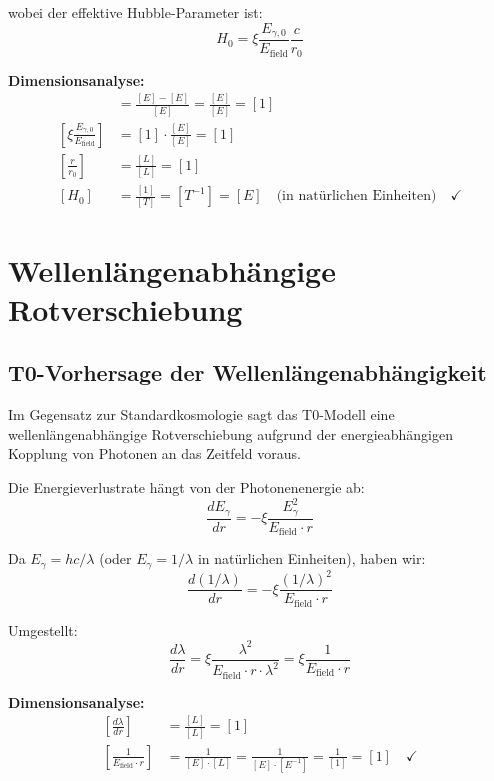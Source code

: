 \documentclass[12pt,a4paper]{report}
\begin{document}
	wobei der effektive Hubble-Parameter ist:
	\begin{equation}
		H_0 = \xi \frac{E_{\gamma,0}}{E_{\text{field}}} \frac{c}{r_0}
	\end{equation}
	
	\textbf{Dimensionsanalyse:}
	\begin{align}
		[z] &= \frac{[E] - [E]}{[E]} = \frac{[E]}{[E]} = [1] \\
		\left[\xi \frac{E_{\gamma,0}}{E_{\text{field}}}\right] &= [1] \cdot \frac{[E]}{[E]} = [1] \\
		\left[\frac{r}{r_0}\right] &= \frac{[L]}{[L]} = [1] \\
		[H_0] &= \frac{[1]}{[T]} = [T^{-1}] = [E] \quad \text{(in natürlichen Einheiten)} \quad \checkmark
	\end{align}
	
	\section{Wellenlängenabhängige Rotverschiebung}
	\label{sec:wavelength_dependent_redshift}
	
\subsection{T0-Vorhersage der Wellenlängenabhängigkeit}
\label{subsec:t0_wavelength_dependence}

Im Gegensatz zur Standardkosmologie sagt das T0-Modell eine wellenlängenabhängige Rotverschiebung aufgrund der energieabhängigen Kopplung von Photonen an das Zeitfeld voraus.

Die Energieverlustrate hängt von der Photonenenergie ab:
\begin{equation}
	\frac{dE_\gamma}{dr} = -\xi \frac{E_\gamma^2}{E_{\text{field}} \cdot r}
\end{equation}

Da $E_\gamma = hc/\lambda$ (oder $E_\gamma = 1/\lambda$ in natürlichen Einheiten), haben wir:
\begin{equation}
	\frac{d(1/\lambda)}{dr} = -\xi \frac{(1/\lambda)^2}{E_{\text{field}} \cdot r}
\end{equation}

Umgestellt:
\begin{equation}
	\frac{d\lambda}{dr} = \xi \frac{\lambda^2}{E_{\text{field}} \cdot r \cdot \lambda^2} = \xi \frac{1}{E_{\text{field}} \cdot r}
\end{equation}

\textbf{Dimensionsanalyse:}
\begin{align}
	\left[\frac{d\lambda}{dr}\right] &= \frac{[L]}{[L]} = [1] \\
	\left[\frac{1}{E_{\text{field}} \cdot r}\right] &= \frac{1}{[E] \cdot [L]} = \frac{1}{[E] \cdot [E^{-1}]} = \frac{1}{[1]} = [1] \quad \checkmark
\end{align}
	
\end{document}
